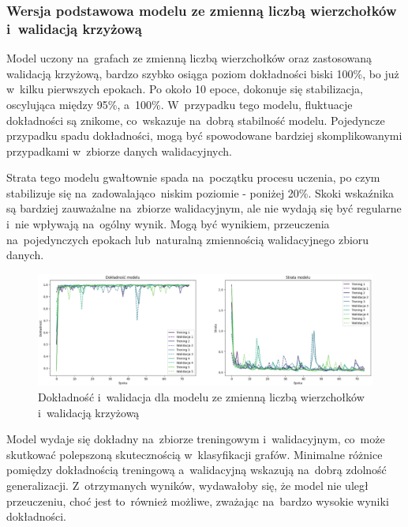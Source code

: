 \subsubsection{Wersja podstawowa modelu ze zmienną liczbą wierzchołków i~walidacją krzyżową}

Model uczony na~grafach ze zmienną liczbą wierzchołków oraz zastosowaną walidacją krzyżową,
bardzo szybko osiąga poziom dokładności biski 100\%, bo już w~kilku pierwszych epokach.
Po około 10 epoce, dokonuje się stabilizacja, oscylująca między 95\%, a~100\%.
W~przypadku tego modelu, fluktuacje dokładności są znikome, co~wskazuje na~dobrą stabilność modelu.
Pojedyncze przypadku spadu dokładności, mogą być spowodowane bardziej skomplikowanymi
przypadkami w~zbiorze danych walidacyjnych.

Strata tego modelu gwałtownie spada na~początku procesu uczenia,
po czym stabilizuje się na~zadowalająco~niskim poziomie - poniżej 20\%.
Skoki wskaźnika są bardziej zauważalne na~zbiorze walidacyjnym,
ale nie wydają się być regularne i~nie wpływają na~ogólny wynik.
Mogą być wynikiem, przeuczenia na~pojedynczych epokach lub~naturalną zmiennością walidacyjnego zbioru danych.

\begin{figure}[ht]
	\centering
	\includegraphics[width=15.5cm]{resources/tests/images/v3/multiple_edges_crossvalid_img.png}
	\caption{Dokładność i~walidacja dla modelu ze zmienną liczbą wierzchołków i~walidacją krzyżową}
	\label{Fig:tests-csvar-0a}
\end{figure}
\FloatBarrier

Model wydaje się dokładny na~zbiorze treningowym i~walidacyjnym,
co~może skutkować polepszoną skutecznością w~klasyfikacji grafów.
Minimalne różnice pomiędzy dokładnością treningową a~walidacyjną wskazują na~dobrą zdolność generalizacji.
Z~otrzymanych wyników, wydawałoby się, że model nie uległ przeuczeniu,
choć jest to~również możliwe, zważając na~bardzo wysokie wyniki dokładności. 

